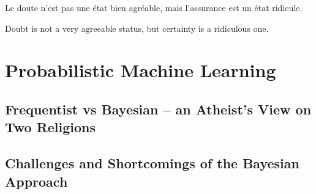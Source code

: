 
\begin{savequote}[8cm]
	\textlatin{Le doute n'est pas une état bien agréable, mais l'assurance est un état ridicule.}
	
	Doubt is not a very agreeable status, but certainty is a ridiculous one.
\end{savequote}


\chapter{Probabilistic Machine Learning}
\label{chp:bayes}






\section{Frequentist vs Bayesian -- an Atheist's View on Two Religions}
\label{sec:bayes:religions}

\section{Challenges and Shortcomings of the Bayesian Approach}
\label{sec:bayes:challenges}
